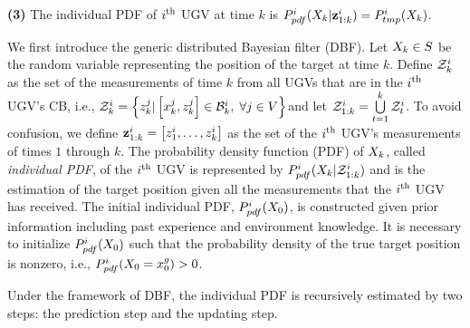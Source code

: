 \begin{algorithm}
\begin{algorithmic}
				\State\textbf{(3)} The individual PDF of $i^\text{th}$ UGV at time $k$ is
				$P^i_{pdf}(X_{k}|\mathbf{z}^{i}_{1:k})=P^i_{tmp}(X_k)$.		
			\end{algorithmic}
		\end{algorithm}

	We first introduce the generic distributed Bayesian filter (DBF).
	Let $X_k\in S$ be the random variable representing the position of the target at time $k$.
	Define $\mathcal{Z}^i_k$ as the set of the measurements of time $k$ from all UGVs that are in the $i^\text{th}$ UGV's CB, i.e., \small$\mathcal{Z}^i_k=\left\lbrace z^j_k| \left[x^j_k,z^j_k\right]\in \mathcal{B}^i_k,\; \forall j\in V\right\rbrace$\normalsize and let $\mathcal{Z}^i_{1:k} = \bigcup\limits_{t=1}^k \mathcal{Z}^i_t$. 
	To avoid confusion, we define $\mathbf{z}^i_{1:k}=\left[z^i_1,\dots,z^i_k\right]$ as the set of the $i^\text{th}$ UGV's measurements of times $1$ through $k$.
	The probability density function (PDF) of $X_k$, called \textit{individual PDF}, of the $i^\text{th}$ UGV is represented by
	$P^i_{pdf}(X_{k}|\mathcal{Z}^i_{1:k})$ and is the estimation of the target position given all the measurements that the $i^\text{th}$ UGV has received.	
	The initial individual PDF, $P^i_{pdf}(X_0)$, is constructed %
	given prior information including past experience and environment knowledge. 
	It is necessary to initialize $P^i_{pdf}(X_0)$ such that the probability density of the true target position is nonzero, i.e., $P^i_{pdf}(X_0=x^g_0)> 0$.
	
	Under the framework of DBF, the individual PDF is recursively estimated by two steps: the prediction step and the updating step. 
	
